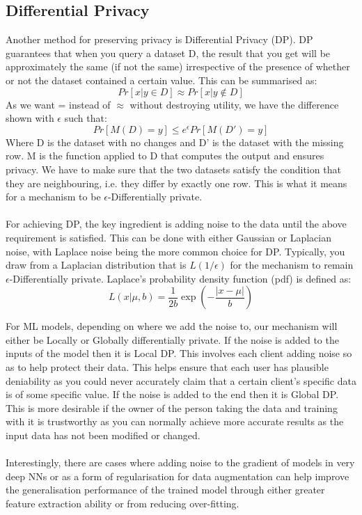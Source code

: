 \subsection{Differential Privacy}
Another method for preserving privacy is Differential Privacy (DP). DP guarantees that when you query a dataset D, the result that you get will be approximately the same (if not the same) irrespective of the presence of whether or not the dataset contained a certain value. This can be summarised as:
\begin{equation}
    Pr[x | y \in D] \approx Pr[x | y \notin D]
\end{equation}
As we want = instead of $\approx$ without destroying utility, we have the difference shown with $\epsilon$ such that:
\begin{equation}
    Pr[M(D) = y] \leq e^\epsilon Pr[M(D') = y]
\end{equation}
Where D is the dataset with no changes and D' is the dataset with the missing row. M is the function applied to D that computes the output and ensures privacy. We have to make sure that the two datasets satisfy the condition that they are neighbouring, i.e. they differ by exactly one row. This is what it means for a mechanism to be $\epsilon$-Differentially private. \\ \\
For achieving DP, the key ingredient is adding noise to the data until the above requirement is satisfied. This can be done with either Gaussian or Laplacian noise, with Laplace noise being the more common choice for DP. Typically, you draw from a Laplacian distribution that is $L(1/\epsilon)$ for the mechanism to remain $\epsilon$-Differentially private. Laplace's probability density function (pdf) is defined as:
\begin{equation}
    L(x|\mu,b) = \dfrac{1}{2b} \exp \left( -\dfrac{|x - \mu|}{b}\right)
\end{equation}

For ML models, depending on where we add the noise to, our mechanism will either be Locally or Globally differentially private. If the noise is added to the inputs of the model then it is Local DP. This involves each client adding noise so as to help protect their data. This helps ensure that each user has plausible deniability as you could never accurately claim that a certain client's specific data is of some specific value. If the noise is added to the end then it is Global DP. This is more desirable if the owner of the person taking the data and training with it is trustworthy as you can normally achieve more accurate results \cite{global_dp} as the input data has not been modified or changed. \\ \\
Interestingly, there are cases where adding noise to the gradient of models in very deep NNs \cite{dnn_noise} or as a form of regularisation for data augmentation \cite{robust_corrupt_noise} can help improve the generalisation performance of the trained model through either greater feature extraction ability or from reducing over-fitting.